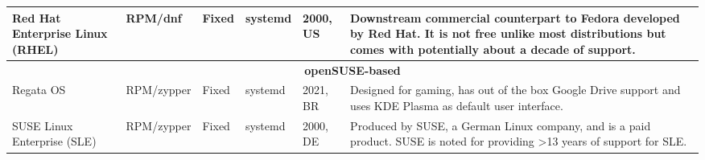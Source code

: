 \documentclass[12pt,a4paper,landscape]{article}
\begin{document}
\begin{longtable}{|p{3.5cm}|p{2.3cm}|p{1.6cm}|p{2.4cm}|p{2.0cm}|p{14.7cm}|}
			Red Hat Enterprise Linux (RHEL) & RPM/dnf & Fixed & systemd & 2000, US & Downstream commercial counterpart to Fedora developed by Red Hat. It is not free unlike most distributions but comes with potentially about a decade of support. \\\hline
			\multicolumn{6}{|c|}{\textbf{openSUSE-based}} \\\hline
			Regata OS & RPM/zypper & Fixed & systemd & 2021, BR & Designed for gaming, has out of the box Google Drive support and uses KDE Plasma as default user interface. \\\hline
			SUSE Linux Enterprise (SLE) & RPM/zypper & Fixed & systemd & 2000, DE & Produced by SUSE, a German Linux company, and is a paid product. SUSE is noted for providing >13 years of support for SLE. \\\hline
	\end{longtable}
	
\end{document}
